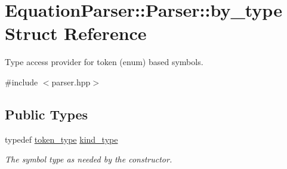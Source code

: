 \hypertarget{structEquationParser_1_1Parser_1_1by__type}{}\section{Equation\+Parser\+:\+:Parser\+:\+:by\+\_\+type Struct Reference}
\label{structEquationParser_1_1Parser_1_1by__type}


Type access provider for token (enum) based symbols.  




{\ttfamily \#include $<$parser.\+hpp$>$}

\subsection*{Public Types}
\begin{DoxyCompactItemize}
\item 
typedef \hyperlink{classEquationParser_1_1Parser_aa29d1fb4fbd9ec112dcb2acd504dc2f1}{token\+\_\+type} \hyperlink{structEquationParser_1_1Parser_1_1by__type_af198f005fea2f0213fff81e59c3d2635}{kind\+\_\+type}\hypertarget{structEquationParser_1_1Parser_1_1by__type_af198f005fea2f0213fff81e59c3d2635}{}\label{structEquationParser_1_1Parser_1_1by__type_af198f005fea2f0213fff81e59c3d2635}

\begin{DoxyCompactList}\small\item\em The symbol type as needed by the constructor. \end{DoxyCompactList}\end{DoxyCompactItemize}
